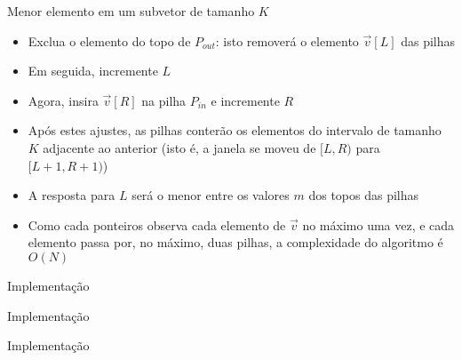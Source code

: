 \begin{frame}[fragile]{Menor elemento em um subvetor de tamanho $K$}

    \begin{itemize}
        \item Exclua o elemento do topo de $P_{out}$: isto removerá o elemento
            $\vec{v}[L]$ das pilhas

        \item Em seguida, incremente $L$

        \item Agora, insira $\vec{v}[R]$ na pilha $P_{in}$  e incremente $R$

        \item Após estes ajustes, as pilhas conterão os elementos do intervalo de tamanho $K$
            adjacente ao anterior (isto é, a janela se moveu de $[L, R)$ para $[L + 1, R + 1)$)

        \item A resposta para $L$ será o menor entre os valores $m$ dos topos das pilhas

        \item Como cada ponteiros observa cada elemento de $\vec{v}$ no máximo uma vez, e cada
            elemento passa por, no máximo, duas pilhas, a complexidade do algoritmo é $O(N)$
    \end{itemize}

\end{frame}



\begin{frame}[fragile]{Implementação}
\end{frame}

\begin{frame}[fragile]{Implementação}
\end{frame}

\begin{frame}[fragile]{Implementação}
\end{frame}


